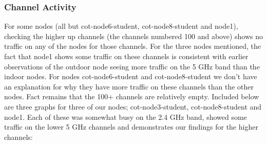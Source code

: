 \documentclass[a4paper, 11pt]{article}
\begin{document}
\subsubsection{Channel Activity}
For some nodes (all but cot-node6-student, cot-node8-student and node1), checking the higher up channels (the channels numbered 100 and above) shows no traffic on any of the nodes for those channels. For the three nodes mentioned, the fact that node1 shows some traffic on these channels is consistent with earlier observations of the outdoor node seeing more traffic on the 5 GHz band than the indoor nodes. For nodes cot-node6-student and cot-node8-student we don't have an explanation for why they have more traffic on these channels than the other nodes. Fact remains that the 100+ channels are relatively empty.
Included below are three graphs for three of our nodes; cot-node3-student, cot-node8-student and node1. Each of these was somewhat busy on the 2.4 GHz band, showed some traffic on the lower 5 GHz channels and demonstrates our findings for the higher channels:
\end{document}
